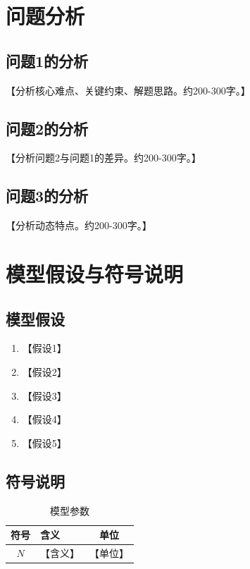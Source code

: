 \documentclass[12pt,a4paper]{ctexart}
\numberwithin{equation}{section}
\numberwithin{figure}{section}
\numberwithin{table}{section}
\begin{document}
\section{问题分析}

\subsection{问题1的分析}
【分析核心难点、关键约束、解题思路。约200-300字。】

\subsection{问题2的分析}
【分析问题2与问题1的差异。约200-300字。】

\subsection{问题3的分析}
【分析动态特点。约200-300字。】

\section{模型假设与符号说明}

\subsection{模型假设}
\begin{enumerate}[label=\arabic*.]
    \item 【假设1】
    \item 【假设2】
    \item 【假设3】
    \item 【假设4】
    \item 【假设5】
\end{enumerate}

\subsection{符号说明}
\begin{table}[H]
\centering
\caption{模型参数}
\begin{tabular}{c|l|c}
\toprule
\textbf{符号} & \textbf{含义} & \textbf{单位} \\
\midrule
$N$ & 【含义】 & 【单位】 \\
\bottomrule
\end{tabular}
\end{table}
\end{document}
